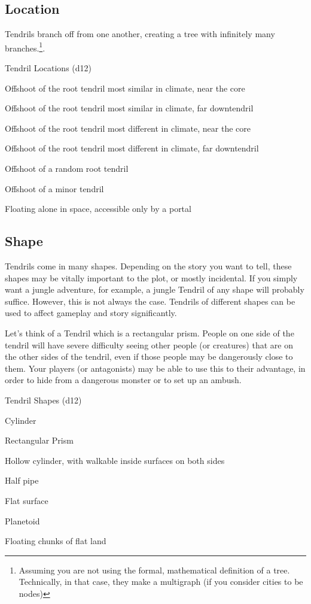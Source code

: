 \begin{multicols*}{2}
\subsection{Location}
Tendrils branch off from one another, creating a tree with infinitely many branches.\footnote{Assuming you are not using the formal, mathematical definition of a tree. Technically, in that case, they make a multigraph (if you consider cities to be nodes)}.


\begin{rolltable}{Tendril Locations (d12)}
\item[1-3] Offshoot of the root tendril most similar in climate, near the core
\item[4-5] Offshoot of the root tendril most similar in climate, far downtendril
\item[6]  Offshoot of the root tendril most different in climate, near the core
\item[7] Offshoot of the root tendril most different in climate, far downtendril
\item[8-10] Offshoot of a random root tendril 
\item[11] Offshoot of a minor tendril
\item[12] Floating alone in space, accessible only by a portal
\end{rolltable}


\subsection{Shape}
Tendrils come in many shapes.
Depending on the story you want to tell, these shapes may be vitally important to the plot, or mostly incidental.
If you simply want a jungle adventure, for example, a jungle Tendril of any shape will probably suffice.
However, this is not always the case.
Tendrils of different shapes can be used to affect gameplay and story significantly.

Let's think of a Tendril which is a rectangular prism.
People on one side of the tendril will have severe difficulty seeing other people (or creatures) that are on the other sides of the tendril, even if those people may be dangerously close to them.
Your players (or antagonists) may be able to use this to their advantage, in order to hide from a dangerous monster or to set up an ambush.


\begin{rolltable}{Tendril Shapes (d12)}
\item[1-2] Cylinder
\item[3-4] Rectangular Prism
\item[5-6] Hollow cylinder, with walkable inside surfaces on both sides
\item[7-8] Half pipe
\item [9-10] Flat surface
\item[11] Planetoid
\item[12] Floating chunks of flat land
\end{rolltable}


\end{multicols*}
